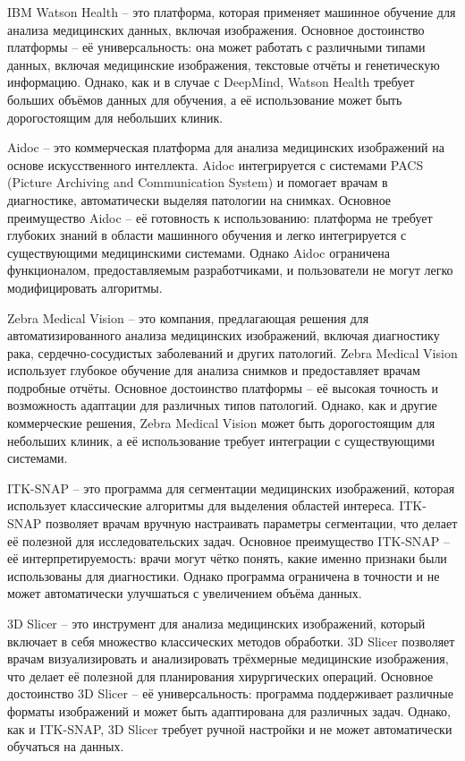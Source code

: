 {  \par \redline IBM Watson Health – это платформа, которая применяет машинное обучение для анализа медицинских данных, включая изображения. Основное достоинство платформы – её универсальность: она может работать с различными типами данных, включая медицинские изображения, текстовые отчёты и генетическую информацию. Однако, как и в случае с DeepMind, Watson Health требует больших объёмов данных для обучения, а её использование может быть дорогостоящим для небольших клиник.

  \par \redline Aidoc – это коммерческая платформа для анализа медицинских изображений на основе искусственного интеллекта. Aidoc интегрируется с системами PACS (Picture Archiving and Communication System) и помогает врачам в диагностике, автоматически выделяя патологии на снимках. Основное преимущество Aidoc – её готовность к использованию: платформа не требует глубоких знаний в области машинного обучения и легко интегрируется с существующими медицинскими системами. Однако Aidoc ограничена функционалом, предоставляемым разработчиками, и пользователи не могут легко модифицировать алгоритмы.

  \par \redline Zebra Medical Vision – это компания, предлагающая решения для автоматизированного анализа медицинских изображений, включая диагностику рака, сердечно-сосудистых заболеваний и других патологий. Zebra Medical Vision использует глубокое обучение для анализа снимков и предоставляет врачам подробные отчёты. Основное достоинство платформы – её высокая точность и возможность адаптации для различных типов патологий. Однако, как и другие коммерческие решения, Zebra Medical Vision может быть дорогостоящим для небольших клиник, а её использование требует интеграции с существующими системами.

  \par \redline ITK-SNAP – это программа для сегментации медицинских изображений, которая использует классические алгоритмы для выделения областей интереса. ITK-SNAP позволяет врачам вручную настраивать параметры сегментации, что делает её полезной для исследовательских задач. Основное преимущество ITK-SNAP – её интерпретируемость: врачи могут чётко понять, какие именно признаки были использованы для диагностики. Однако программа ограничена в точности и не может автоматически улучшаться с увеличением объёма данных.

  \par \redline 3D Slicer – это инструмент для анализа медицинских изображений, который включает в себя множество классических методов обработки. 3D Slicer позволяет врачам визуализировать и анализировать трёхмерные медицинские изображения, что делает её полезной для планирования хирургических операций. Основное достоинство 3D Slicer – её универсальность: программа поддерживает различные форматы изображений и может быть адаптирована для различных задач. Однако, как и ITK-SNAP, 3D Slicer требует ручной настройки и не может автоматически обучаться на данных.

}
